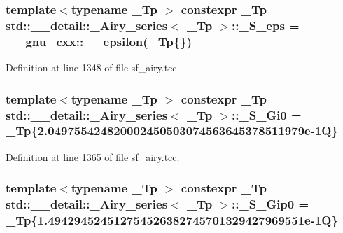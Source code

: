 \subsubsection[{\texorpdfstring{\+\_\+\+S\+\_\+eps}{_S_eps}}]{\setlength{\rightskip}{0pt plus 5cm}template$<$typename \+\_\+\+Tp $>$ constexpr \+\_\+\+Tp {\bf std\+::\+\_\+\+\_\+detail\+::\+\_\+\+Airy\+\_\+series}$<$ \+\_\+\+Tp $>$\+::\+\_\+\+S\+\_\+eps = \+\_\+\+\_\+gnu\+\_\+cxx\+::\+\_\+\+\_\+epsilon(\+\_\+\+Tp\{\})\hspace{0.3cm}{\ttfamily [static]}}\hypertarget{classstd_1_1____detail_1_1__Airy__series_aeeb50187c007e2436a80dde35250cabd}{}\label{classstd_1_1____detail_1_1__Airy__series_aeeb50187c007e2436a80dde35250cabd}


Definition at line 1348 of file sf\+\_\+airy.\+tcc.

\subsubsection[{\texorpdfstring{\+\_\+\+S\+\_\+\+Gi0}{_S_Gi0}}]{\setlength{\rightskip}{0pt plus 5cm}template$<$typename \+\_\+\+Tp $>$ constexpr \+\_\+\+Tp {\bf std\+::\+\_\+\+\_\+detail\+::\+\_\+\+Airy\+\_\+series}$<$ \+\_\+\+Tp $>$\+::\+\_\+\+S\+\_\+\+Gi0 = \+\_\+\+Tp\{2.\+049755424820002450503074563645378511979e-\/1\+Q\}\hspace{0.3cm}{\ttfamily [static]}}\hypertarget{classstd_1_1____detail_1_1__Airy__series_a1ffe2a989d5ab598db201c77d08dc96d}{}\label{classstd_1_1____detail_1_1__Airy__series_a1ffe2a989d5ab598db201c77d08dc96d}


Definition at line 1365 of file sf\+\_\+airy.\+tcc.

\subsubsection[{\texorpdfstring{\+\_\+\+S\+\_\+\+Gip0}{_S_Gip0}}]{\setlength{\rightskip}{0pt plus 5cm}template$<$typename \+\_\+\+Tp $>$ constexpr \+\_\+\+Tp {\bf std\+::\+\_\+\+\_\+detail\+::\+\_\+\+Airy\+\_\+series}$<$ \+\_\+\+Tp $>$\+::\+\_\+\+S\+\_\+\+Gip0 = \+\_\+\+Tp\{1.\+494294524512754526382745701329427969551e-\/1\+Q\}\hspace{0.3cm}{\ttfamily [static]}}\hypertarget{classstd_1_1____detail_1_1__Airy__series_aa2269595bf85d349e9e5a1e6e4abb1a4}{}\label{classstd_1_1____detail_1_1__Airy__series_aa2269595bf85d349e9e5a1e6e4abb1a4}


